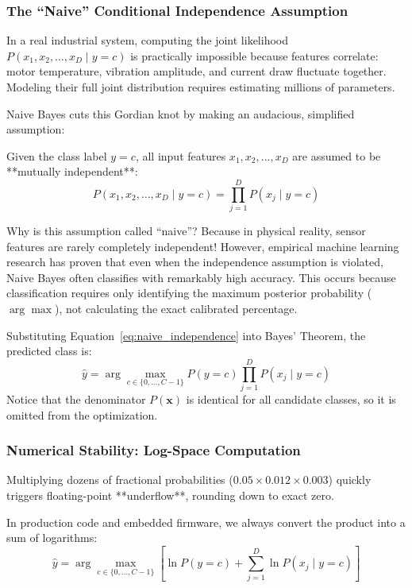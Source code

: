 \subsubsection{The ``Naive'' Conditional Independence Assumption}
In a real industrial system, computing the joint likelihood $P(x_1, x_2, \dots, x_D \mid y = c)$ is practically impossible because features correlate: motor temperature, vibration amplitude, and current draw fluctuate together. Modeling their full joint distribution requires estimating millions of parameters.

Naive Bayes cuts this Gordian knot by making an audacious, simplified assumption:
\begin{keyidea}
Given the class label $y = c$, all input features $x_1, x_2, \dots, x_D$ are assumed to be **mutually independent**:
\begin{equation}
P(x_1, x_2, \dots, x_D \mid y = c) = \prod_{j=1}^{D} P(x_j \mid y = c)\label{eq:naive_independence}
\end{equation}
\end{keyidea}
Why is this assumption called ``naive''? Because in physical reality, sensor features are rarely completely independent! However, empirical machine learning research has proven that even when the independence assumption is violated, Naive Bayes often classifies with remarkably high accuracy. This occurs because classification requires only identifying the maximum posterior probability ($\arg\max$), not calculating the exact calibrated percentage.

Substituting Equation~\eqref{eq:naive_independence} into Bayes' Theorem, the predicted class is:
\begin{equation}
\hat{y} = \arg\max_{c \in \{0, \dots, C-1\}} P(y = c) \prod_{j=1}^{D} P(x_j \mid y = c)\label{eq:naive_bayes_decision}
\end{equation}
Notice that the denominator $P(\mathbf{x})$ is identical for all candidate classes, so it is omitted from the optimization.

\subsubsection{Numerical Stability: Log-Space Computation}
Multiplying dozens of fractional probabilities ($0.05 \times 0.012 \times 0.003$) quickly triggers floating-point **underflow**, rounding down to exact zero. 

In production code and embedded firmware, we always convert the product into a sum of logarithms:
\begin{equation}
\hat{y} = \arg\max_{c \in \{0, \dots, C-1\}} \left[ \ln P(y = c) + \sum_{j=1}^{D} \ln P(x_j \mid y = c) \right]\label{eq:naive_bayes_log_space}
\end{equation}


